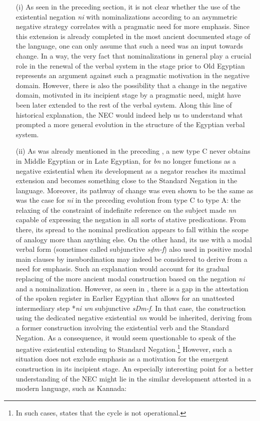 \documentclass[output=paper,draft,draftmode,colorlinks,citecolor=brown]{langscibook}
\begin{document}
\begin{enumerate}
\item[(i)] As seen in the preceding section, it is not clear whether the use of the existential negation \textit{ni} with nominalizations according to an asymmetric negative strategy correlates with a pragmatic need for more emphasis. Since this extension is already completed in the most ancient documented stage of the language, one can only assume that such a need was an input towards change. In a way, the very fact that nominalizations in general play a crucial role in the renewal of the verbal system in the stage prior to Old Egyptian represents an argument against such a pragmatic motivation in the negative domain. However, there is also the possibility that a change in the negative domain, motivated in its incipient stage by a pragmatic need, might have been later extended to the rest of the verbal system. Along this line of historical explanation, the NEC would indeed help us to understand what prompted a more general evolution in the structure of the Egyptian verbal system.

\item[(ii)] As was already mentioned in the preceding , a new type C never obtains in Middle Egyptian or in Late Egyptian, for \textit{bn} no longer functions as a negative existential when its development as a negator reaches its maximal extension and becomes something close to the Standard Negation in the language. Moreover, its pathway of change was even shown to be the same as was the case for \textit{ni} in the preceding evolution from type C to type A: the relaxing of the constraint of indefinite reference on the subject made \textit{nn} capable of expressing the negation in all sorts of stative predications. From there, its spread to the nominal predication appears to fall within the scope of analogy more than anything else. On the other hand, its use with a modal verbal form (sometimes called subjunctive \textit{sḏm-f}) also used in positive modal main clauses by insubordination may indeed be considered to derive from a need for emphasis. Such an explanation would account for its gradual replacing of the more ancient modal construction based on the negation \textit{ni} and a nominalization. However, as seen in , there is a gap in the attestation of the spoken register in Earlier Egyptian that allows for an unattested intermediary step *\textit{ni wn} subjunctive \textit{sDm-f}. In that case, the construction using the dedicated negative existential \textit{nn} would be inherited, deriving from a former construction involving the existential verb and the Standard Negation. As a consequence, it would seem questionable to speak of the negative existential extending to Standard Negation.\footnote{In such cases, \citet{Veselinova2014} states that the cycle is not operational.}
However, such a situation does not exclude emphasis as a motivation for the emergent construction in its incipient stage. An especially interesting point for a better understanding of the NEC might lie in the similar development attested in a modern language, such as Kannada:


\end{enumerate}
\end{document}
